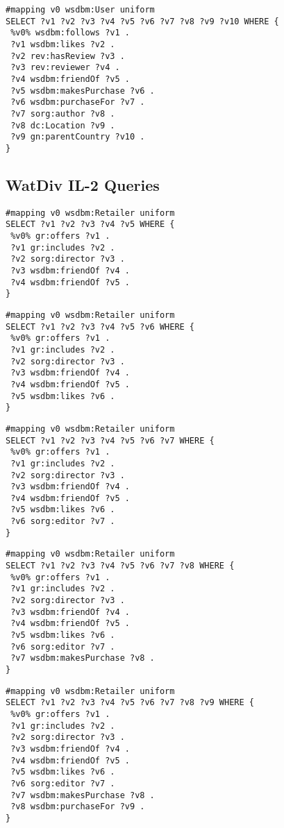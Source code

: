\begin{lstlisting}[caption={IL-1-10},label=query:IL-1-10]
#mapping v0 wsdbm:User uniform
SELECT ?v1 ?v2 ?v3 ?v4 ?v5 ?v6 ?v7 ?v8 ?v9 ?v10 WHERE {
 %v0% wsdbm:follows ?v1 .
 ?v1 wsdbm:likes ?v2 .
 ?v2 rev:hasReview ?v3 .
 ?v3 rev:reviewer ?v4 .
 ?v4 wsdbm:friendOf ?v5 .
 ?v5 wsdbm:makesPurchase ?v6 .
 ?v6 wsdbm:purchaseFor ?v7 .
 ?v7 sorg:author ?v8 .
 ?v8 dc:Location ?v9 .
 ?v9 gn:parentCountry ?v10 .
}
\end{lstlisting}

\subsection{WatDiv IL-2 Queries} 

\begin{lstlisting}[caption={IL-2-5},label=query:IL-2-5]
#mapping v0 wsdbm:Retailer uniform
SELECT ?v1 ?v2 ?v3 ?v4 ?v5 WHERE {
 %v0% gr:offers ?v1 .
 ?v1 gr:includes ?v2 .
 ?v2 sorg:director ?v3 .
 ?v3 wsdbm:friendOf ?v4 .
 ?v4 wsdbm:friendOf ?v5 .
}
\end{lstlisting}

\begin{lstlisting}[caption={IL-2-7},label=query:IL-2-6]
#mapping v0 wsdbm:Retailer uniform
SELECT ?v1 ?v2 ?v3 ?v4 ?v5 ?v6 WHERE {
 %v0% gr:offers ?v1 .
 ?v1 gr:includes ?v2 .
 ?v2 sorg:director ?v3 .
 ?v3 wsdbm:friendOf ?v4 .
 ?v4 wsdbm:friendOf ?v5 .
 ?v5 wsdbm:likes ?v6 .
}
\end{lstlisting}

\begin{lstlisting}[caption={IL-2-7},label=query:IL-2-7]
#mapping v0 wsdbm:Retailer uniform
SELECT ?v1 ?v2 ?v3 ?v4 ?v5 ?v6 ?v7 WHERE {
 %v0% gr:offers ?v1 .
 ?v1 gr:includes ?v2 .
 ?v2 sorg:director ?v3 .
 ?v3 wsdbm:friendOf ?v4 .
 ?v4 wsdbm:friendOf ?v5 .
 ?v5 wsdbm:likes ?v6 .
 ?v6 sorg:editor ?v7 .
}
\end{lstlisting}

\begin{lstlisting}[caption={IL-2-8},label=query:IL-2-8]
#mapping v0 wsdbm:Retailer uniform
SELECT ?v1 ?v2 ?v3 ?v4 ?v5 ?v6 ?v7 ?v8 WHERE {
 %v0% gr:offers ?v1 .
 ?v1 gr:includes ?v2 .
 ?v2 sorg:director ?v3 .
 ?v3 wsdbm:friendOf ?v4 .
 ?v4 wsdbm:friendOf ?v5 .
 ?v5 wsdbm:likes ?v6 .
 ?v6 sorg:editor ?v7 .
 ?v7 wsdbm:makesPurchase ?v8 .
}
\end{lstlisting}

\begin{lstlisting}[caption={IL-2-9},label=query:IL-2-9]
#mapping v0 wsdbm:Retailer uniform
SELECT ?v1 ?v2 ?v3 ?v4 ?v5 ?v6 ?v7 ?v8 ?v9 WHERE {
 %v0% gr:offers ?v1 .
 ?v1 gr:includes ?v2 .
 ?v2 sorg:director ?v3 .
 ?v3 wsdbm:friendOf ?v4 .
 ?v4 wsdbm:friendOf ?v5 .
 ?v5 wsdbm:likes ?v6 .
 ?v6 sorg:editor ?v7 .
 ?v7 wsdbm:makesPurchase ?v8 .
 ?v8 wsdbm:purchaseFor ?v9 .
}
\end{lstlisting}

